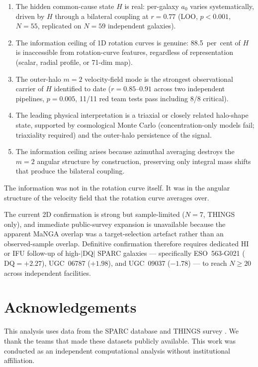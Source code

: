 \documentclass[fleqn,usenatbib]{mnras}
\newcommand{\azero}{a_0}
\newcommand{\DQ}{\mathrm{DQ}}
\newcommand{\mtwo}{m{=}2}
\begin{document}
\begin{enumerate}
\item The hidden common-cause state $H$ is real: per-galaxy $\azero$ varies systematically, driven by $H$ through a bilateral coupling at $r = 0.77$ (LOO, $p < 0.001$, $N = 55$, replicated on $N = 59$ independent galaxies).
\item The information ceiling of 1D rotation curves is genuine: 88.5~per~cent of $H$ is inaccessible from rotation-curve features, regardless of representation (scalar, radial profile, or 71-dim map).
\item The outer-halo $\mtwo$ velocity-field mode is the strongest observational carrier of $H$ identified to date ($r = 0.85$--$0.91$ across two independent pipelines, $p = 0.005$, 11/11 red team tests pass including 8/8 critical).
\item The leading physical interpretation is a triaxial or closely related halo-shape state, supported by cosmological Monte Carlo (concentration-only models fail; triaxiality required) and the outer-halo persistence of the signal.
\item The information ceiling arises because azimuthal averaging destroys the $\mtwo$ angular structure by construction, preserving only integral mass shifts that produce the bilateral coupling.
\end{enumerate}

The information was not in the rotation curve itself.
It was in the angular structure of the velocity field that the rotation curve averages over.

The current 2D confirmation is strong but sample-limited ($N = 7$, THINGS only), and immediate public-survey expansion is unavailable because the apparent MaNGA overlap was a target-selection artefact rather than an observed-sample overlap.
Definitive confirmation therefore requires dedicated HI or IFU follow-up of high-$|\DQ|$ SPARC galaxies --- specifically ESO~563-G021 ($\DQ = +2.27$), UGC~06787 ($+1.98$), and UGC~09037 ($-1.78$) --- to reach $N \geq 20$ across independent facilities.


\section*{Acknowledgements}

This analysis uses data from the SPARC database \citep{Lelli2016} and THINGS survey \citep{Walter2008}.
We thank the teams that made these datasets publicly available.
This work was conducted as an independent computational analysis without institutional affiliation.
\end{document}
